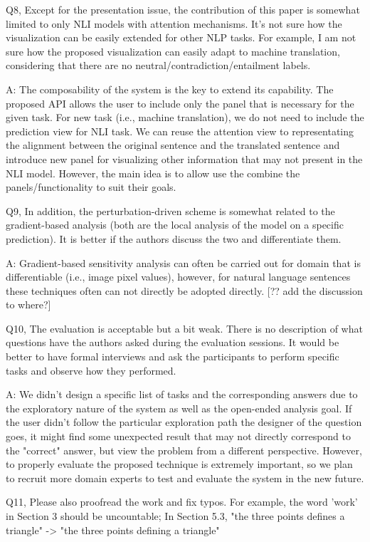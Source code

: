 Q8, Except for the presentation issue, the contribution of this paper is somewhat limited to only NLI models with attention mechanisms. It's not sure how the visualization can be easily extended for other NLP tasks. For example, I am not sure how the proposed visualization can easily adapt to machine translation, considering that there are no neutral/contradiction/entailment labels.

A: The composability of the system is the key to extend its capability. The proposed API allows the user to include only the panel that is necessary for the given task. For new task (i.e., machine translation), we do not need to include the prediction view for NLI task. We can reuse the attention view to representating the alignment between the original sentence and the translated sentence and introduce new panel for visualizing other information that may not present in the NLI model. However, the main idea is to allow use the combine the panels/functionality to suit their goals.

Q9, In addition, the perturbation-driven scheme is somewhat related to the gradient-based analysis (both are the local analysis of the model on a specific prediction). It is better if the authors discuss the two and differentiate them.

A: Gradient-based sensitivity analysis can often be carried out for domain that is differentiable (i.e., image pixel values), however, for natural language sentences these techniques often can not directly be adopted directly. [?? add the discussion to where?]

Q10, The evaluation is acceptable but a bit weak. There is no description of what questions have the authors asked during the evaluation sessions. It would be better to have formal interviews and ask the participants to perform specific tasks and observe how they performed.

A: We didn't design a specific list of tasks and the corresponding answers due to the exploratory nature of the system as well as the open-ended analysis goal. If the user didn't follow the particular exploration path the designer of the question goes, it might find some unexpected result that may not directly correspond to the "correct" answer, but view the problem from a different perspective. However, to properly evaluate the proposed technique is extremely important, so we plan to recruit more domain experts to test and evaluate the system in the new future.

Q11, Please also proofread the work and fix typos. For example, the word 'work' in Section 3 should be uncountable; In Section 5.3, "the three points defines a triangle" -> "the three points defining a triangle"

